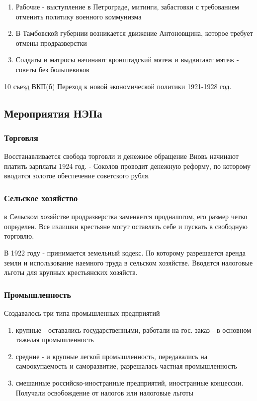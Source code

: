 \documentclass[a4paper]{article}
\begin{document}
\begin{enumerate}
\item Рабочие - выступление в Петрограде, митинги, забастовки с требованием отменить политику военного коммунизма

\item В Тамбовской губернии возникается движение Антоновщина, которое требует отмены продразверстки

\item Солдаты и матросы начинают кронштадский мятеж и выдвигают мятеж - советы без большевиков
\end{enumerate}

10 съезд ВКП(б)
Переход к новой экономической политики 1921-1928 год.
\subsection{Мероприятия НЭПа}
\subsubsection{Торговля}
Восстанавливается свобода торговли и денежное обращение
Вновь начинают платить зарплаты
1924 год. - Соколов проводит денежную реформу, по которому вводится золотое обеспечение советского рубля.
\subsubsection{Сельское хозяйство}
в Сельском хозяйстве продразверстка заменяется продналогом, его размер четко определен. Все излишки крестьяне могут оставлять себе и пускать в свободную торговлю.

В 1922 году - принимается земельный кодекс. По которому разрешается аренда земли и использование наемного труда в сельском хозяйстве. Вводятся налоговые льготы для крупных крестьянских хозяйств.

\subsubsection{Промышленность}
Создавалось три типа промышленных предприятий
\begin{enumerate}
    \item крупные - оставались государственными, работали на гос. заказ - в основном тяжелая промышленность
    \item средние - и крупные легкой промышленность, передавались на самоокупаемость и саморазвитие, разрешалась частная промышленность
    \item смешанные российско-иностранные предприятий, иностранные концессии. Получали освобождение от налогов или налоговые льготы
\end{enumerate}
\end{document}
